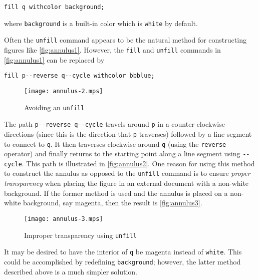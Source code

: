 \begin{center}
  \verb|fill q withcolor background;|
\end{center}
where \texttt{background} is a built-in color which is \texttt{white} by
default.

Often the \texttt{unfill} command appears to be the natural method for
constructing figures like \autoref{fig:annulus1}.  However, the
\texttt{fill} and \texttt{unfill} commands in \autoref{fig:annulus1} can
be replaced by

\begin{center}
  \verb|fill p--reverse q--cycle withcolor bbblue;|
\end{center}

\begin{figure}
  \centering
  \texttt{[image: annulus-2.mps]}
  \caption{Avoiding an \texttt{unfill}}
  \label{fig:annulus2}
\end{figure}

The path \verb|p--reverse q--cycle| travels around \texttt{p} in a
counter-clockwise directions (since this is the direction that
\texttt{p} traverses) followed by a line segment to connect to
\texttt{q}.  It then traverses clockwise around \texttt{q} (using the
\texttt{reverse} operator) and finally returns to the starting point
along a line segment using \texttt{-{}-cycle}.  This path is illustrated
in \autoref{fig:annulus2}.  One reason for using this method to
construct the annulus as opposed to the \texttt{unfill} command is to
ensure \textit{proper transparency} when placing the figure in an
external document with a non-white background.  If the former method is
used and the annulus is placed on a non-white background, say magenta,
then the result is \autoref{fig:annulus3}.

\begin{figure}
  \centering
  \texttt{[image: annulus-3.mps]}
  \caption{Improper transparency using \texttt{unfill}}
  \label{fig:annulus3}
\end{figure}

It may be desired to have the interior of \texttt{q} be magenta instead
of \texttt{white}.  This could be accomplished by redefining
\texttt{background}; however, the latter method described above is a
much simpler solution.
